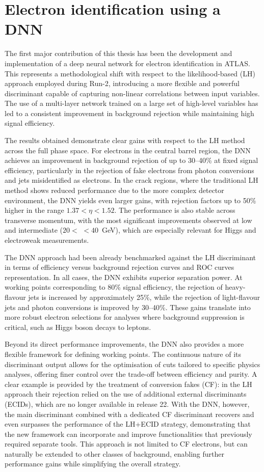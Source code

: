 \section{Electron identification using a DNN}
The first major contribution of this thesis has been the development and implementation of a deep neural network for electron identification in ATLAS. This represents a methodological shift with respect to the likelihood-based (LH) approach employed during Run-2, introducing a more flexible and powerful discriminant capable of capturing non-linear correlations between input variables. The use of a multi-layer network trained on a large set of high-level variables has led to a consistent improvement in background rejection while maintaining high signal efficiency.

The results obtained demonstrate clear gains with respect to the LH method across the full phase space. For electrons in the central barrel region, the DNN achieves an improvement in background rejection of up to 30–40\% at fixed signal efficiency, particularly in the rejection of fake electrons from photon conversions and jets misidentified as electrons. In the crack regions, where the traditional LH method shows reduced performance due to the more complex detector environment, the DNN yields even larger gains, with rejection factors up to 50\% higher in the range 
$1.37 < \eta <1.52$. The performance is also stable across transverse momentum, with the most significant improvements observed at low and intermediate \et ($20 <$ \et $< 40$~GeV), which are especially relevant for Higgs and electroweak measurements.

The DNN approach had been already benchmarked against the LH discriminant in terms of efficiency versus background rejection curves and ROC curves representation. In all cases, the DNN exhibits superior separation power. At working points corresponding to 80\% signal efficiency, the rejection of heavy-flavour jets is increased by approximately 25\%, while the rejection of light-flavour jets and photon conversions is improved by 30–40\%. These gains translate into more robust electron selections for analyses where background suppression is critical, such as Higgs boson decays to leptons.

Beyond its direct performance improvements, the DNN also provides a more flexible framework for defining working points. The continuous nature of its discriminant output allows for the optimisation of cuts tailored to specific physics analyses, offering finer control over the trade-off between efficiency and purity. A clear example is provided by the treatment of conversion fakes (CF): in the LH approach their rejection relied on the use of additional external discriminants (ECIDs), which are no longer available in release 22. With the DNN, however, the main discriminant combined with a dedicated CF discriminant recovers and even surpasses the performance of the LH+ECID strategy, demonstrating that the new framework can incorporate and improve functionalities that previously required separate tools. This approach is not limited to CF electrons, but can naturally be extended to other classes of background, enabling further performance gains while simplifying the overall strategy. 

